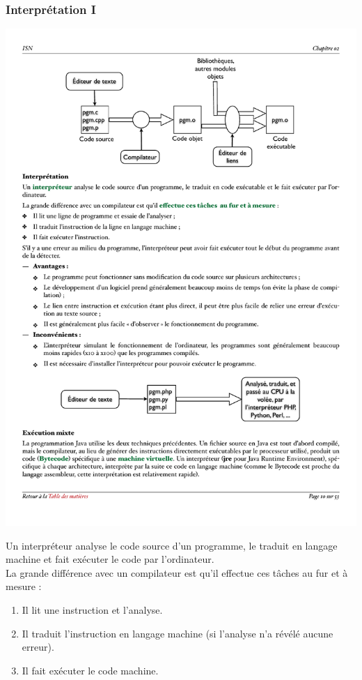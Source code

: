 \documentclass[utf8,10pt]{beamer}
\begin{document}
\begin{frame}
    \frametitle{Interprétation I}
    \begin{block}{}
    \begin{center}
        \includegraphics[scale=0.5]{./images/Interprétation}
    \end{center}
    \end{block}
    
    Un interpréteur \alert{analyse} le code source d’un programme, le \alert{traduit} en langage machine
     et fait exécuter le code par l’ordinateur.\\
    La grande différence avec un compilateur est qu’il effectue ces tâches  \alert{au fur et à mesure} :
    \begin{enumerate}
        \item Il lit une instruction et l’analyse.
        \item Il traduit l’instruction en langage machine (si l'analyse n'a révélé aucune erreur).
        \item Il fait exécuter le code machine.
    \end{enumerate}
    
\end{frame}
\end{document}
